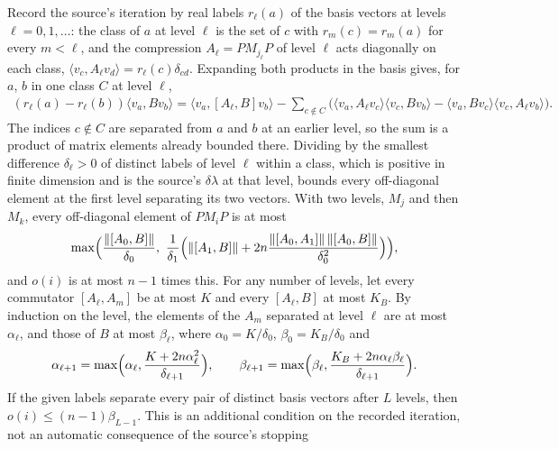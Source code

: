 \documentclass{article}
\begin{document}
Record the source's iteration by real labels $r_\ell(a)$ of the basis vectors at
levels $\ell=0,1,\dots$: the class of $a$ at level $\ell$ is the set of $c$
with $r_m(c)=r_m(a)$ for every $m<\ell$, and the compression $A_\ell=PM_{j_\ell}P$
of level $\ell$ acts diagonally on each class,
$\langle v_c,A_\ell v_d\rangle=r_\ell(c)\delta_{cd}$. Expanding both products in
the basis gives, for $a$, $b$ in one class $C$ at level $\ell$,
\begin{align}
  (r_\ell(a)-r_\ell(b))\langle v_a,Bv_b\rangle
  =\langle v_a,[A_\ell,B]v_b\rangle
  -\sum_{c\notin C}\bigl(\langle v_a,A_\ell v_c\rangle\langle v_c,Bv_b\rangle
    -\langle v_a,Bv_c\rangle\langle v_c,A_\ell v_b\rangle\bigr).
  \label{eq:hastings05_two_dim_ground_basis_iteration}
\end{align}
The indices $c\notin C$ are separated from $a$ and $b$ at an earlier level, so
the sum is a product of matrix elements already bounded there. Dividing by the
smallest difference $\delta_\ell>0$ of distinct labels of level $\ell$ within a
class, which is positive in finite dimension and is the source's
$\delta\lambda$ at that level, bounds every off-diagonal element at the first
level separating its two vectors. With two levels, $M_j$ and then $M_k$, every
off-diagonal element of $PM_iP$ is at most
\begin{align}
  \max\Bigl(\frac{\lVert[A_0,B]\rVert}{\delta_0},\
  \frac{1}{\delta_1}\Bigl(\lVert[A_1,B]\rVert
    +2n\frac{\lVert[A_0,A_1]\rVert\,\lVert[A_0,B]\rVert}{\delta_0^2}\Bigr)\Bigr),
  \label{eq:hastings05_two_dim_ground_basis_two_levels}
\end{align}
and $o(i)$ is at most $n-1$ times this. For any number of levels, let every
commutator $[A_\ell,A_m]$ be at most $K$ and every $[A_\ell,B]$ at most $K_B$.
By induction on the level, the elements of the $A_m$ separated at level $\ell$
are at most $\alpha_\ell$, and those of $B$ at most $\beta_\ell$, where
$\alpha_0=K/\delta_0$, $\beta_0=K_B/\delta_0$ and
\begin{align}
  \alpha_{\ell+1}=\max\Bigl(\alpha_\ell,\frac{K+2n\alpha_\ell^2}{\delta_{\ell+1}}\Bigr),
  \qquad
  \beta_{\ell+1}=\max\Bigl(\beta_\ell,\frac{K_B+2n\alpha_\ell\beta_\ell}{\delta_{\ell+1}}\Bigr).
  \label{eq:hastings05_two_dim_ground_basis_levels}
\end{align}
If the given labels separate every pair of distinct basis vectors after $L$
levels, then $o(i)\le(n-1)\beta_{L-1}$. This is an additional condition on the
recorded iteration, not an automatic consequence of the source's stopping
\end{document}
